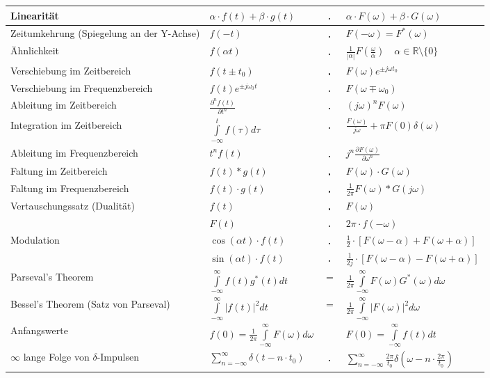 \begin{tabular}{|p{8cm}|l c l|}
  \hline
 	Linearität & 
 	$\alpha\cdot f(t) + \beta\cdot g(t)$ & $\FT$ & $\alpha\cdot F(\omega) + \beta\cdot G(\omega)$\\
 	\hline
  Zeitumkehrung (Spiegelung an der Y-Achse)&
  $f(-t)$ & $\FT$ & $F(-\omega) = F^*(\omega)$ \\
	\hline        	
	Ähnlichkeit &
	$f(\alpha t)$ & $\FT$ & $\frac{1}{|\alpha|}F \left (\frac{\omega}{\alpha} \right) \quad\alpha \in\mathbb{R}\setminus \{0\}$\\
	\hline
	Verschiebung im	Zeitbereich &
	$f(t\pm t_0)$ & $\FT$ & $F(\omega)e^{\pm j\omega t_0}$\\
	\hline
  Verschiebung im Frequenzbereich &
	$f(t)e^{\pm j\omega_0 t}$ & $\FT$ & $F(\omega\mp\omega_0)$\\
	\hline
	Ableitung im Zeitbereich &
	$\frac{\partial^n f(t)}{\partial t^n}$ & $\FT$ & $(j\omega)^n F(\omega)$\\
	\hline
	Integration im Zeitbereich &
	$\int\limits_{-\infty}^{t}f(\tau)d\tau $ & $\FT$ & 
	$\frac{F(\omega)}{j\omega}+\pi F(0)\delta(\omega)$\\
	\hline				
	Ableitung im Frequenzbereich &
	$t^n f(t)$ & $\FT$ & $j^n \frac{\partial F(\omega)}{\partial \omega^n}$\\
	\hline		
	Faltung im Zeitbereich &
	$f(t) \ast g(t)$ & $\FT$ & $F(\omega) \cdot G(\omega)$\\
	\hline
	Faltung im Frequenzbereich &
	$f(t) \cdot g(t)$ & $\FT$ & $\frac{1}{2\pi}F(\omega) \ast G(j\omega)$\\
	\hline
	Vertauschungssatz (Dualität) &
	$f(t)$ & $\FT$ & $F(\omega)\nonumber$ \\
	& $F(t)$ & $\FT$ & $2\pi \cdot f(-\omega)$\\
	\hline
	Modulation &
	$\cos(\alpha t) \cdot f(t)$ & $\FT$ & $\frac{1}{2}\cdot \left[F(\omega-\alpha) + F(\omega+\alpha)\right ]$\\
	& $\sin(\alpha t) \cdot f(t)$ & $\FT$ & $\frac{1}{2j}\cdot \left[	F(\omega-\alpha) - F(\omega+\alpha)\right ]$\\
	\hline
 	Parseval's Theorem &
  $\int\limits_{-\infty}^{\infty}f(t)g^{\ast}(t)dt $ & $=$ & $ \frac{1}{2\pi}	\int\limits_{-\infty}^{\infty}F(\omega)G^{\ast}(\omega)d\omega$\\
	\hline
	Bessel's Theorem (Satz von Parseval) &
	$\int\limits_{-\infty}^{\infty}|f(t)|^2 dt $ & $=$ & $ \frac{1}{2\pi}\int\limits_{-\infty}^{\infty}|F(\omega)|^2 d\omega$\\
	\hline 			
  Anfangswerte &
  $f(0)=\frac{1}{2\pi}\int\limits_{-\infty}^{\infty}F(\omega)d\omega$ 
  && $ F(0)=\int\limits_{-\infty}^{\infty}f(t)dt$\\
	\hline
	$\infty$ lange Folge von $\delta$-Impulsen &
	$\sum\limits_{n=-\infty}^{\infty} \delta(t-n\cdot t_0)$ & $\FT$ & 
	$\sum\limits_{n=-\infty}^{\infty} \frac{2\pi}{t_0}\delta(\omega-n\cdot \frac{2\pi}{t_0})$\\
	\hline
\end{tabular}
\renewcommand{\arraystretch}{1}


